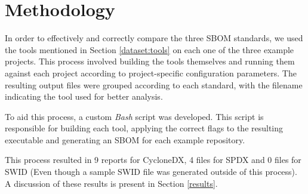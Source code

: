 \section{Methodology}

In order to effectively and correctly compare the three SBOM standards, we used the tools mentioned in Section \ref{dataset:tools} on each one of the three example projects. This process involved building the tools themselves and running them against each project according to project-specific configuration parameters. The resulting output files were grouped according to each standard, with the filename indicating the tool used for better analysis.

To aid this process, a custom \emph{Bash} script was developed. This script is responsible for building each tool, applying the correct flags to the resulting executable and generating an SBOM for each example repository.

This process resulted in 9 reports for CycloneDX, 4 files for SPDX and 0 files for SWID (Even though a sample SWID file was generated outside of this process). A discussion of these results is present in Section \ref{results}.